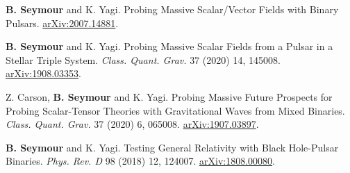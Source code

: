 



\begin{cvpublications}

    \cvpublication
        {\textbf{B. Seymour} and K. Yagi. Probing Massive Scalar/Vector Fields with Binary Pulsars.
        \href{https://arxiv.org/abs/2007.14881}{arXiv:2007.14881}.
        } %

  \cvpublication
    {\textbf{B. Seymour} and K. Yagi. Probing Massive Scalar Fields from a Pulsar in a Stellar Triple System.
    \textit{Class. Quant. Grav.} 37 (2020) 14, 145008.
    \href{https://arxiv.org/abs/1908.03353}{arXiv:1908.03353}. } %
    
  \cvpublication
    {Z. Carson, \textbf{B. Seymour} and K. Yagi. Probing Massive Future Prospects for Probing Scalar-Tensor Theories with Gravitational Waves from Mixed Binaries. \textit{Class. Quant. Grav.} 37 (2020) 6, 065008. \href{https://arxiv.org/abs/1907.03897}{arXiv:1907.03897}. } %

  \cvpublication
    {\textbf{B. Seymour} and K. Yagi. Testing General Relativity with Black Hole-Pulsar Binaries. \textit{Phys. Rev. D} 98 (2018) 12, 124007. \href{https://arxiv.org/abs/1808.00080}{arXiv:1808.00080}.} %
    

\end{cvpublications}




    

